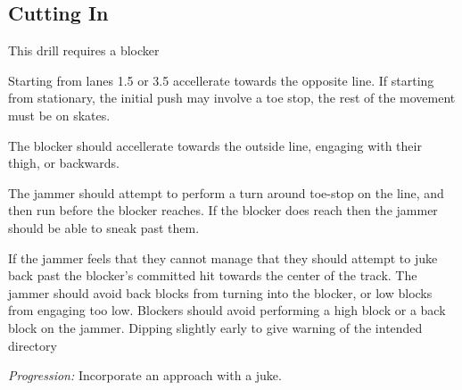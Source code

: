 \subsection*{Cutting In}
\label{drill:line_to_line_jamming:toe_stop_line_run}

This drill requires a blocker

Starting from lanes 1.5 or 3.5 accellerate towards the opposite line.
If starting from stationary, the initial push may involve a toe stop, the rest of the movement must be on skates.

The blocker should accellerate towards the outside line, engaging with their thigh, or backwards.

The jammer should attempt to perform a turn around toe-stop on the line, and then run before the blocker reaches.
If the blocker does reach then the jammer should be able to sneak past them.  


If the jammer feels that they cannot manage that they should attempt to juke back past the blocker's committed hit towards the center of the track.
The jammer should avoid back blocks from turning into the blocker, or low blocks from engaging too low.   
Blockers should avoid performing a high block or a back block on the jammer.
Dipping slightly early to give warning of the intended directory



%


{\it Progression:} Incorporate an approach with a juke.

